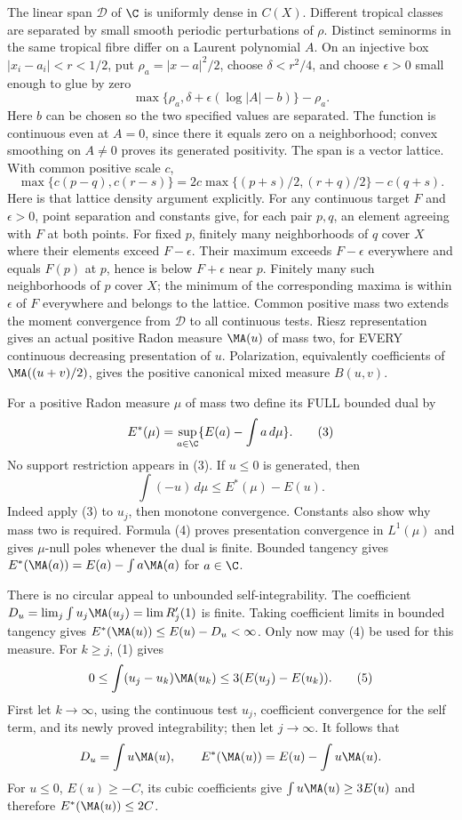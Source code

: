 The linear span $\mathcal D$ of $\C$ is uniformly dense in $C(X)$.
Different tropical classes are separated by small smooth periodic perturbations
of $\rho$. Distinct seminorms in the same tropical fibre differ on a Laurent
polynomial $A$. On an injective box $|x_i-a_i|<r<1/2$, put
$\rho_a=|x-a|^2/2$, choose $\delta<r^2/4$, and choose $\epsilon>0$
small enough to glue by zero
\[
 \max\{\rho_a,\delta+\epsilon(\log|A|-b)\}-\rho_a.              \tag{2}
\]
Here $b$ can be chosen so the two specified values are separated. The function
is continuous even at $A=0$, since there it equals zero on a neighborhood;
convex smoothing on $A\ne0$ proves its generated positivity.
The span is a vector lattice. With common positive scale $c$,
\[
 \max\{c(p-q),c(r-s)\}
 =2c\max\{(p+s)/2,(r+q)/2\}-c(q+s).
\]
Here is that lattice density argument explicitly. For any continuous target
$F$ and $\epsilon>0$, point separation and constants give, for each pair
$p,q$, an element agreeing with $F$ at both points. For fixed $p$, finitely
many neighborhoods of $q$ cover $X$ where their elements exceed
$F-\epsilon$. Their maximum exceeds $F-\epsilon$ everywhere and equals
$F(p)$ at $p$, hence is below $F+\epsilon$ near $p$. Finitely many such
neighborhoods of $p$ cover $X$; the minimum of the corresponding maxima
is within $\epsilon$ of $F$ everywhere and belongs to the lattice. Common positive mass two extends the moment convergence
from $\mathcal D$ to all continuous tests. Riesz representation gives an
actual positive Radon measure $\MA(u)$ of mass two, for EVERY continuous
decreasing presentation of $u$. Polarization, equivalently coefficients of
$\MA((u+v)/2)$, gives the positive canonical mixed measure $B(u,v)$.

For a positive Radon measure $\mu$ of mass two define its FULL bounded dual by
\[
 E^*(\mu)=\sup_{a\in\C}\{E(a)-\int a\,d\mu\}.               \tag{3}
\]
No support restriction appears in (3). If $u\le0$ is generated, then
\[
 \int(-u)\,d\mu\le E^*(\mu)-E(u).                          \tag{4}
\]
Indeed apply (3) to $u_j$, then monotone convergence. Constants also show why
mass two is required. Formula (4) proves presentation convergence in
$L^1(\mu)$ and gives $\mu$-null poles whenever the dual is finite.
Bounded tangency gives
$E^*(\MA(a))=E(a)-\int a\MA(a)$ for $a\in\C$.

There is no circular appeal to unbounded self-integrability.
The coefficient $D_u=\lim_j\int u_j\MA(u_j)=\lim R_j'(1)$ is finite.
Taking coefficient limits in bounded tangency gives
$E^*(\MA(u))\le E(u)-D_u<\infty$. Only now may (4) be used for this measure.
For $k\ge j$, (1) gives
\[
 0\le\int(u_j-u_k)\MA(u_k)\le3(E(u_j)-E(u_k)).               \tag{5}
\]
First let $k\to\infty$, using the continuous test $u_j$, coefficient convergence
for the self term, and its newly proved integrability; then let $j\to\infty$.
It follows that
\[
 D_u=\int u\MA(u),\qquad
 E^*(\MA(u))=E(u)-\int u\MA(u).
\]
For $u\le0$, $E(u)\ge-C$, its cubic coefficients give
$\int u\MA(u)\ge3E(u)$ and therefore $E^*(\MA(u))\le2C$.

